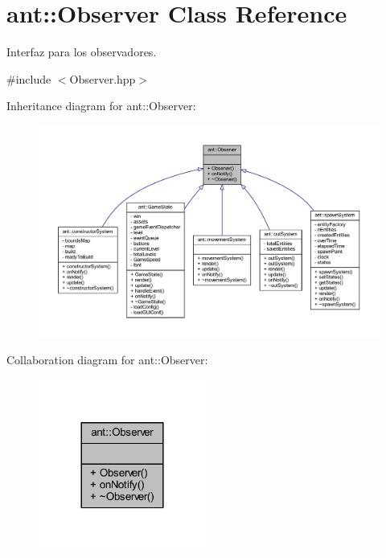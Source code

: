 \hypertarget{classant_1_1_observer}{\section{ant\+:\+:Observer Class Reference}
\label{classant_1_1_observer}
}


Interfaz para los observadores.  




{\ttfamily \#include $<$Observer.\+hpp$>$}



Inheritance diagram for ant\+:\+:Observer\+:
\nopagebreak
\begin{figure}[H]
\begin{center}
\leavevmode
\includegraphics[width=350pt]{d5/de0/classant_1_1_observer__inherit__graph}
\end{center}
\end{figure}


Collaboration diagram for ant\+:\+:Observer\+:
\nopagebreak
\begin{figure}[H]
\begin{center}
\leavevmode
\includegraphics[width=156pt]{dd/d38/classant_1_1_observer__coll__graph}
\end{center}
\end{figure}
